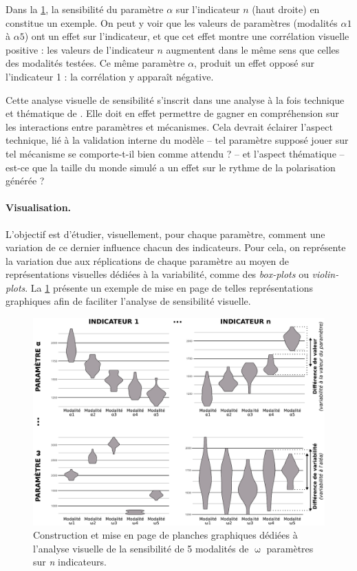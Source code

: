 Dans la \cref{fig:exemple-visu-sensib}, la sensibilité du paramètre $\alpha$ sur l'indicateur $n$ (haut droite) en constitue un exemple.
On peut y voir que les valeurs de paramètres (modalités $\alpha1$ à $\alpha5$) ont un effet sur l'indicateur, et que cet effet montre une corrélation visuelle positive : les valeurs de l'indicateur $n$ augmentent dans le même sens que celles des modalités testées.
Ce même paramètre $\alpha$, produit un effet opposé sur l'indicateur 1 : la corrélation y apparaît négative.

Cette analyse visuelle de sensibilité s'inscrit dans une analyse à la fois technique et thématique de \simfeodal{}.
Elle doit en effet permettre de gagner en compréhension sur les interactions entre paramètres et mécanismes.
Cela devrait éclairer l'aspect technique, lié à la validation interne du modèle -- tel paramètre supposé jouer sur tel mécanisme se comporte-t-il bien comme attendu ? -- et l'aspect thématique -- est-ce que la taille du monde simulé a un effet sur le rythme de la polarisation générée ?


\paragraph{Visualisation.}

L'objectif est d'étudier, visuellement, pour chaque paramètre, comment une variation de ce dernier influence chacun des indicateurs.
Pour cela, on représente la variation due aux réplications de chaque paramètre au moyen de représentations visuelles dédiées à la variabilité, comme des \textit{box-plots} ou \textit{violin-plots}.
La \cref{fig:exemple-visu-sensib} présente un exemple de mise en page de telles représentations graphiques afin de faciliter l'analyse de sensibilité visuelle.
\begin{figure}[H]
	\centering
	\includegraphics[width=\linewidth]{img/schema_violinplots_sensib.pdf}
	\caption[Construction et mise en page de planches graphiques dédiées à l'analyse visuelle de la sensibilité.]{Construction et mise en page de planches graphiques dédiées à l'analyse visuelle de la sensibilité de 5 modalités de $\upomega$ paramètres sur \textit{n} indicateurs.}
	\label{fig:exemple-visu-sensib}
\end{figure}

